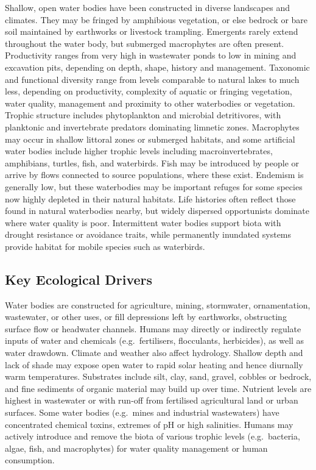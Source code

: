 \documentclass[
  letterpaper,
  DIV=11,
  numbers=noendperiod]{scrartcl}
\begin{document}
Shallow, open water bodies have been constructed in diverse landscapes
and climates. They may be fringed by amphibious vegetation, or else
bedrock or bare soil maintained by earthworks or livestock trampling.
Emergents rarely extend throughout the water body, but submerged
macrophytes are often present. Productivity ranges from very high in
wastewater ponds to low in mining and excavation pits, depending on
depth, shape, history and management. Taxonomic and functional diversity
range from levels comparable to natural lakes to much less, depending on
productivity, complexity of aquatic or fringing vegetation, water
quality, management and proximity to other waterbodies or vegetation.
Trophic structure includes phytoplankton and microbial detritivores,
with planktonic and invertebrate predators dominating limnetic zones.
Macrophytes may occur in shallow littoral zones or submerged habitats,
and some artificial water bodies include higher trophic levels including
macroinvertebrates, amphibians, turtles, fish, and waterbirds. Fish may
be introduced by people or arrive by flows connected to source
populations, where these exist. Endemism is generally low, but these
waterbodies may be important refuges for some species now highly
depleted in their natural habitats. Life histories often reflect those
found in natural waterbodies nearby, but widely dispersed opportunists
dominate where water quality is poor. Intermittent water bodies support
biota with drought resistance or avoidance traits, while permanently
inundated systems provide habitat for mobile species such as waterbirds.

\subsection{Key Ecological Drivers}\label{key-ecological-drivers-127}

Water bodies are constructed for agriculture, mining, stormwater,
ornamentation, wastewater, or other uses, or fill depressions left by
earthworks, obstructing surface flow or headwater channels. Humans may
directly or indirectly regulate inputs of water and chemicals
(e.g.~fertilisers, flocculants, herbicides), as well as water drawdown.
Climate and weather also affect hydrology. Shallow depth and lack of
shade may expose open water to rapid solar heating and hence diurnally
warm temperatures. Substrates include silt, clay, sand, gravel, cobbles
or bedrock, and fine sediments of organic material may build up over
time. Nutrient levels are highest in wastewater or with run-off from
fertilised agricultural land or urban surfaces. Some water bodies
(e.g.~mines and industrial wastewaters) have concentrated chemical
toxins, extremes of pH or high salinities. Humans may actively introduce
and remove the biota of various trophic levels (e.g.~bacteria, algae,
fish, and macrophytes) for water quality management or human
consumption.
\end{document}
